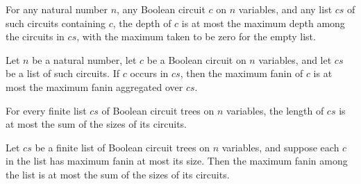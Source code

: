 \begin{theorem}
\label{BoolCircuit.TreeCircuit.depth_le_maxDepth}
\leanok
{}
For any natural number $n$, any Boolean circuit $c$ on $n$ variables, and any list $cs$
of such circuits containing $c$, the depth of $c$ is at most the maximum depth among the
circuits in $cs$, with the maximum taken to be zero for the empty list.
\end{theorem}

\begin{theorem}
\label{BoolCircuit.TreeCircuit.maxFanin_le_maxFaninL}
\leanok
{}
Let $n$ be a natural number, let $c$ be a Boolean circuit on $n$ variables, and let $cs$
be a list of such circuits. If $c$ occurs in $cs$, then the maximum fanin of $c$ is at
most the maximum fanin aggregated over $cs$.
\end{theorem}

\begin{theorem}
\label{BoolCircuit.TreeCircuit.length_le_sumSize}
\leanok
{}
For every finite list $cs$ of Boolean circuit trees on $n$ variables, the length of $cs$
is at most the sum of the sizes of its circuits.
\end{theorem}

\begin{theorem}
\label{BoolCircuit.TreeCircuit.maxFaninL_le_sumSize}
\leanok
{}
Let $cs$ be a finite list of Boolean circuit trees on $n$ variables, and suppose each
$c$ in the list has maximum fanin at most its size. Then the maximum fanin among the
list is at most the sum of the sizes of its circuits.
\end{theorem}

